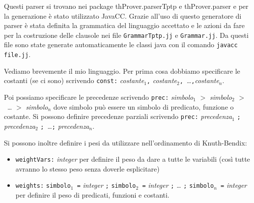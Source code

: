 \documentclass[a4paper,11pt]{article} %
\newcommand{\sintassi}{\texttt}
\newcommand{\file}{\texttt}
\newcommand{\package}{\textsf}
\newcommand{\com}{\texttt}
\newcommand{\classe}{\textsf}
\begin{document}
Questi parser si trovano nei package \package{thProver.parserTptp} e 
\package{thProver.parser} e per la generazione è stato utilizzato \textsf{JavaCC}. 
Grazie all'uso di questo generatore di parser %
è stata definita
la grammatica del linguaggio accettato e le azioni da fare per la costruzione
delle clausole nei file \file{GrammarTptp.jj} e \file{Grammar.jj}. Da questi file
sono state generate automaticamente le classi java con il comando \com{javacc file.jj}.

Vediamo brevemente il mio linguaggio. 
Per prima cosa dobbiamo specificare le costanti (se ci sono) scrivendo
\sintassi{const:} \emph{costante$_{1}$}\sintassi{,}
\emph{costante$_{2}$}\sintassi{,}~\ldots\sintassi{,}\emph{costante$_{n}$}.

Poi possiamo specificare le precedenze scrivendo \sintassi{prec:} 
\emph{simbolo$_{1}$} \sintassi{$>$} \emph{simbolo$_{2}$} \sintassi{$>$}~\dots
\sintassi{$>$} \emph{simbolo$_{n}$}
dove simbolo può essere un simbolo di predicato, funzione o costante. Si possono
definire precedenze parziali scrivendo
\sintassi{prec:} \emph{precedenza$_{1}$} \sintassi{;} \emph{precedenza$_{2}$}
\sintassi{;}~\dots \sintassi{;} \emph{precedenza$_{n}$}. 
%

Si possono inoltre definire i pesi da utilizzare nell'ordinamento di 
Knuth-Bendix:
\begin{itemize}
  \item{\sintassi{weightVars:} \emph{integer}} per definire il peso da dare a tutte
le variabili (così tutte avranno lo stesso peso senza doverle esplicitare)
  \item{\sintassi{weights:} \sintassi{simbolo$_{1}$ =} \emph{integer} \sintassi{;} 
\sintassi{simbolo$_{2}$ =} \emph{integer} \sintassi{;} \emph{\ldots} \sintassi{;} 
\sintassi{simbolo$_{n}$ =} \emph{integer}} per definire il peso di predicati, 
funzioni e costanti.
\end{itemize}
\end{document}

